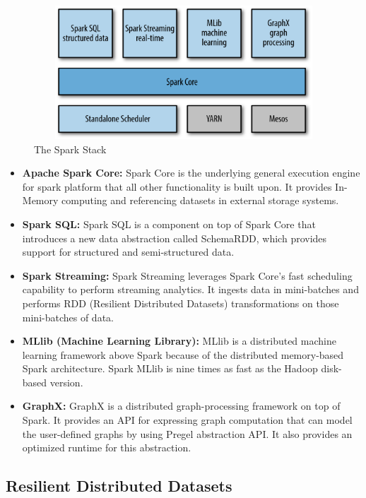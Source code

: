 \begin{figure}[!ht]
\begin{center}
\includegraphics[width=13cm,height=5cm]{chapter2/fig3.png}
\end{center}
\caption{The Spark Stack}
\label{component}
\end{figure}



\begin{itemize}
\item \textbf{Apache Spark Core:} Spark Core is the underlying general execution engine for spark platform that all other functionality is built upon. It provides In-Memory computing and referencing datasets in external storage systems.
\item \textbf{Spark SQL:} Spark SQL is a component on top of Spark Core that introduces a new data abstraction called SchemaRDD, which provides support for structured and semi-structured data.
\item \textbf{Spark Streaming:} Spark Streaming leverages Spark Core's fast scheduling capability to perform streaming analytics. It ingests data in mini-batches and performs RDD (Resilient Distributed Datasets) transformations on those mini-batches of data.
\item \textbf{MLlib (Machine Learning Library):} MLlib is a distributed machine learning framework above Spark because of the distributed memory-based Spark architecture. Spark MLlib is nine times as fast as the Hadoop disk-based version.
\item \textbf{GraphX:} GraphX is a distributed graph-processing framework on top of Spark. It provides an API for expressing graph computation that can model the user-defined graphs by using Pregel abstraction API. It also provides an optimized runtime for this abstraction.\\
\end{itemize}

\subsection{Resilient Distributed Datasets}

